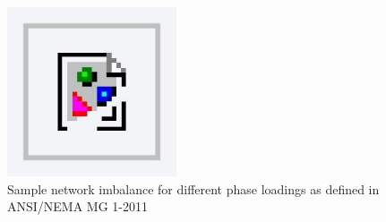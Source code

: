 \begin{figure}\centering
	\includegraphics[width=5cm]{foo}
	\caption{Sample network imbalance for different phase loadings as defined in ANSI/NEMA MG 1-2011}
	\label{ch1:fig:power-unbalance}
\end{figure}